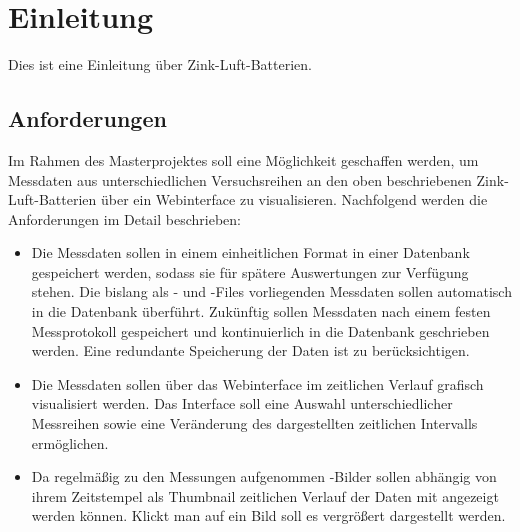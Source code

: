\chapter{Einleitung}\label{ch:einleitung}


Dies ist eine Einleitung über Zink-Luft-Batterien.


\section{Anforderungen}

Im Rahmen des Masterprojektes soll eine Möglichkeit geschaffen werden, um Messdaten aus unterschiedlichen Versuchsreihen an den oben beschriebenen Zink-Luft-Batterien über ein Webinterface zu visualisieren. Nachfolgend werden die Anforderungen im Detail beschrieben:

\begin{itemize}

\item Die Messdaten sollen in einem einheitlichen Format in einer Datenbank gespeichert werden, sodass sie für spätere Auswertungen zur Verfügung stehen. Die bislang als - und -Files vorliegenden Messdaten sollen automatisch in die Datenbank überführt. Zukünftig sollen Messdaten nach einem festen Messprotokoll gespeichert und kontinuierlich in die Datenbank geschrieben werden. Eine redundante Speicherung der Daten ist zu berücksichtigen.

\item Die Messdaten sollen über das Webinterface im zeitlichen Verlauf grafisch visualisiert werden. Das Interface soll eine Auswahl unterschiedlicher Messreihen sowie eine Veränderung des dargestellten zeitlichen Intervalls ermöglichen.

\item Da regelmäßig zu den Messungen aufgenommen -Bilder sollen abhängig von ihrem Zeitstempel als Thumbnail zeitlichen Verlauf der Daten mit angezeigt werden können. Klickt man auf ein Bild soll es vergrößert dargestellt werden.

\end{itemize}

